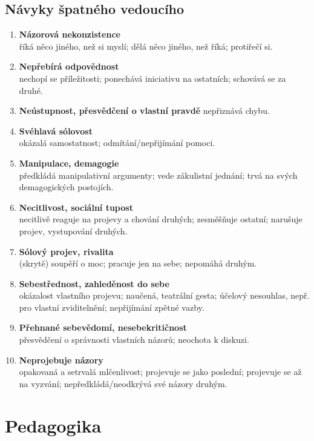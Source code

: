 \documentclass[a4paper,12pt,final]{report}
\begin{document}
\section{Návyky špatného vedoucího}\pagelogos
\begin{enumerate}
 \item \textbf{Názorová nekonzistence} \\
 říká něco jiného, než si myslí; dělá něco jiného, než říká; protiřečí si.
 \item \textbf{Nepřebírá odpovědnost} \\
 nechopí se příležitosti; ponechává iniciativu na ostatních; schovává se za druhé.
 \item \textbf{Neústupnost, přesvědčení o vlastní pravdě} nepřiznává chybu.
 \item \textbf{Svéhlavá sólovost} \\
 okázalá samostatnost; odmítání/nepřijímání pomoci.
 \item \textbf{Manipulace, demagogie} \\
 předkládá manipulativní argumenty; vede zákulistní jednání; trvá na svých demagogických postojích.
 \item \textbf{Necitlivost, sociální tupost} \\
 necitlivě reaguje na projevy a chování druhých; zesměšňuje ostatní; narušuje projev, vystupování druhých.
 \item \textbf{Sólový projev, rivalita} \\
 (skrytě) soupěří o moc; pracuje jen na sebe; nepomáhá druhým.
 \item \textbf{Sebestřednost, zahleděnost do sebe} \\
 okázalost vlastního projevu; naučená, teatrální gesta; účelový nesouhlas, nepř. pro vlastní zviditelnění; nepřijímání zpětné vazby.
 \item \textbf{Přehnané sebevědomí, nesebekritičnost} \\
 přesvědčení o správnosti vlastních názorů; neochota k diskuzi.
 \item \textbf{Neprojebuje názory} \\
 opakovaná a setrvalá mlčenlivost; projevuje se jako poslední; projevuje se až na vyzvání; nepředkládá/neodkrývá své názory druhým.
\end{enumerate}\pagelogos




\newpage
\pagelogos
\chapter{Pedagogika}
\end{document}
